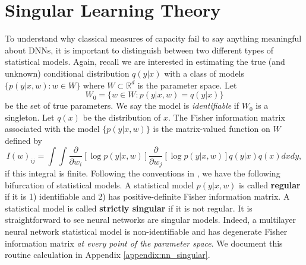\documentclass{article} %
\begin{document}
\section{Singular Learning Theory}
To understand why classical measures of capacity fail to say anything meaningful about DNNs, it is important to distinguish between two different types of statistical models. Again, recall we are interested in estimating the true (and unknown) conditional distribution $q(y|x)$ with a class of models $\{p(y|x,w): w \in W\}$ where $W \subset \mathbb R^d$ is the parameter space. Let 
$$
W_0 = \{w \in W: p(y|x,w)=q(y|x)\}
$$
 be the set of true parameters. We say the model is \textit{identifiable} if $W_0$ is a singleton. Let $q(x)$ be the distribution of $x$. The Fisher information matrix associated with the model $\{p(y|x,w)\}$ is the matrix-valued function on $W$ defined by
 \begin{equation*}
 I(w)_{ij} = \int\!\int \frac{\partial}{\partial w_i}[ \log p(y|x,w) ] \frac{\partial}{\partial w_j}[ \log p(y|x,w) ] q(y|x) q(x) dx dy,
 \label{eq:FIM}
 \end{equation*}
if this integral is finite. 
Following the conventions in \cite{watanabe_algebraic_2009}, we have the following bifurcation of statistical models.
A statistical model $p(y|x,w)$ is called \textbf{regular} if it is 1) identifiable and 2) has positive-definite Fisher information matrix. A statistical model is called \textbf{strictly singular} if it is not regular. 
It is straightforward to see neural networks are singular models. Indeed, a multilayer neural network statistical model is non-identifiable and has degenerate Fisher information matrix \emph{at every point of the parameter space}. We document this routine calculation in Appendix \ref{appendix:nn_singular}. 
\end{document}
